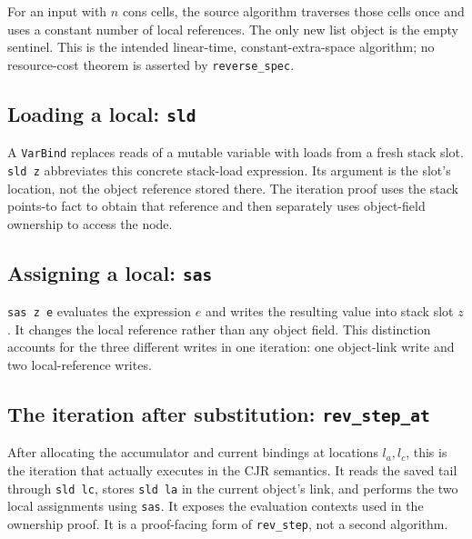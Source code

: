 \documentclass[11pt]{article}
\begin{document}
For an input with \(n\) cons cells, the source algorithm traverses those cells
once and uses a constant number of local references. The only new list object
is the empty sentinel. This is the intended linear-time, constant-extra-space
algorithm; no resource-cost theorem is asserted by \texttt{reverse\_spec}.

\subsection{Loading a local: \texttt{sld}}

\begin{minipage}{\linewidth}

\end{minipage}

A \texttt{VarBind} replaces reads of a mutable variable with loads from a fresh
stack slot. \texttt{sld z} abbreviates this concrete stack-load expression.
Its argument is the slot's location, not the object reference stored there.
The iteration proof uses the stack points-to fact to obtain that reference
and then separately uses object-field ownership to access the node.

\subsection{Assigning a local: \texttt{sas}}

\begin{minipage}{\linewidth}

\end{minipage}

\texttt{sas z e} evaluates the expression \(e\) and writes the resulting value
into stack slot \(z\). It changes the local reference rather than any object
field. This distinction accounts for the three different writes in one
iteration: one object-link write and two local-reference writes.

\subsection{The iteration after substitution: \texttt{rev\_step\_at}}

\begin{minipage}{\linewidth}

\end{minipage}

After allocating the accumulator and current bindings at locations
\(l_a,l_c\), this is the iteration that actually executes in the CJR semantics.
It reads the saved tail through \texttt{sld lc}, stores \texttt{sld la} in the
current object's link, and performs the two local assignments using
\texttt{sas}. It exposes the evaluation contexts used in the ownership proof.
It is a proof-facing form of \texttt{rev\_step}, not a second algorithm.
\end{document}
